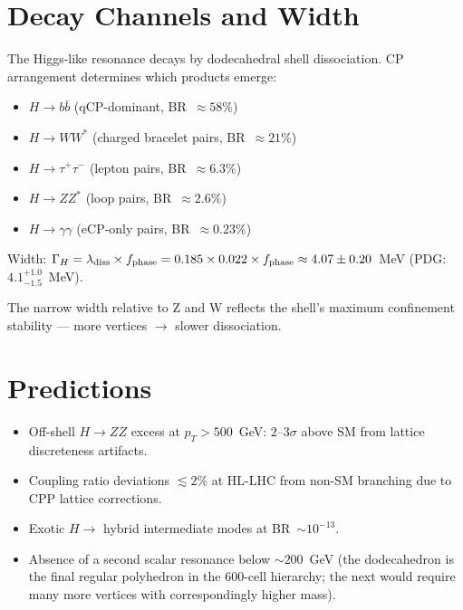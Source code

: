 \documentclass[11pt,a4paper]{article}
\begin{document}
\section{Decay Channels and Width}

The Higgs-like resonance decays by dodecahedral shell dissociation.
CP arrangement determines which products emerge:
\begin{itemize}
\item $H\to b\bar b$ (qCP-dominant, BR~$\approx58\%$)
\item $H\to WW^*$ (charged bracelet pairs, BR~$\approx21\%$)
\item $H\to\tau^+\tau^-$ (lepton pairs, BR~$\approx6.3\%$)
\item $H\to ZZ^*$ (loop pairs, BR~$\approx2.6\%$)
\item $H\to\gamma\gamma$ (eCP-only pairs, BR~$\approx0.23\%$)
\end{itemize}

Width: $\Gamma_H = \lambda_{\rm diss}\times f_{\rm phase}
= 0.185\times 0.022\times f_{\rm phase}
\approx 4.07\pm0.20$~MeV (PDG: $4.1^{+1.0}_{-1.5}$~MeV).

The narrow width relative to Z and W reflects the shell's maximum
confinement stability --- more vertices $\to$ slower dissociation.

\section{Predictions}

\begin{itemize}
\item Off-shell $H\to ZZ$ excess at $p_T > 500$~GeV:
  $2$--$3\sigma$ above SM from lattice discreteness artifacts.
\item Coupling ratio deviations $\lesssim 2\%$ at HL-LHC from
  non-SM branching due to CPP lattice corrections.
\item Exotic $H\to$ hybrid intermediate modes at BR~$\sim10^{-13}$.
\item Absence of a second scalar resonance below $\sim200$~GeV
  (the dodecahedron is the final regular polyhedron in the 600-cell
  hierarchy; the next would require many more vertices with
  correspondingly higher mass).
\end{itemize}
\end{document}

